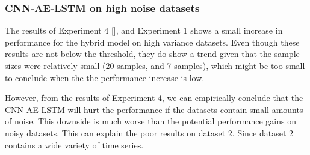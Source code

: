 




\subsubsection{CNN-AE-LSTM on high noise datasets}
The results of Experiment 4 [],
and Experiment 1 shows a small increase in performance for the hybrid model on high variance datasets.
Even though these results are not below the threshold, they do show a trend given that the sample sizes were relatively small
(20 samples, and 7 samples), which might be too small to conclude when the
the performance increase is low.

However, from the results of Experiment 4, we can empirically conclude that the CNN-AE-LSTM will
hurt the performance if the datasets contain small amounts of noise. This downside is much
worse than the potential performance gains on noisy datasets.
This can explain the poor results on dataset 2. Since dataset 2 contains a wide variety
of time series.




